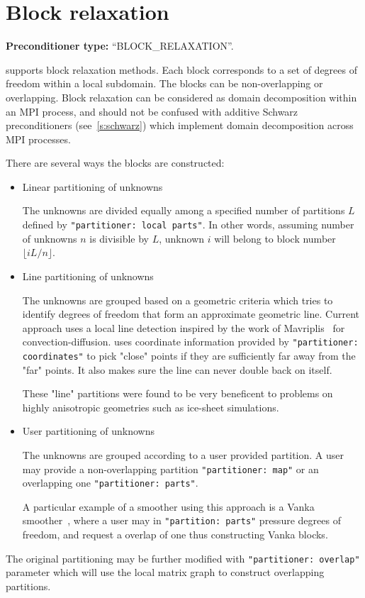\section{Block relaxation}\label{s:block_relaxation}

\textbf{Preconditioner type:} ``BLOCK\_RELAXATION''.


\ifpacktwo{} supports block relaxation methods. Each block corresponds to a set
of degrees of freedom within a local subdomain. The blocks can be
non-overlapping or overlapping. Block relaxation can be considered as domain
decomposition within an MPI process, and should not be confused with additive
Schwarz preconditioners (see~\ref{s:schwarz}) which implement domain
decomposition across MPI processes.

There are several ways the blocks are constructed:
\begin{itemize}
  \item Linear partitioning of unknowns

    The unknowns are divided equally among a specified number of
    partitions $L$ defined by {\tt "partitioner: local parts"}. In other words,
    assuming number of unknowns $n$ is divisible by $L$, unknown $i$ will belong
    to block number $\lfloor iL/n \rfloor$.

  \item Line partitioning of unknowns

    The unknowns are grouped based on a geometric criteria which tries to
    identify degrees of freedom that form an approximate geometric line.
    Current approach uses a local line detection inspired by the work of
    Mavriplis~\cite{Mavriplis1999} for convection-diffusion. \ifpacktwo uses
    coordinate information provided by {\tt "partitioner: coordinates"} to pick
    "close" points if they are sufficiently far away from the "far" points. It
    also makes sure the line can never double back on itself.

    These "line" partitions were found to be very beneficent to problems on
    highly anisotropic geometries such as ice-sheet simulations.

  \item User partitioning of unknowns

    The unknowns are grouped according to a user provided partition. A user
    may provide a non-overlapping partition {\tt "partitioner: map"} or an
    overlapping one {\tt "partitioner: parts"}.

    A particular example of a smoother using this approach is a Vanka
    smoother~\cite{Vanka1986}, where a user may in {\tt "partition: parts"} pressure
    degrees of freedom, and request a overlap of one thus constructing Vanka
    blocks.
\end{itemize}
The original partitioning may be further modified with {\tt "partitioner: overlap"}
parameter which will use the local matrix graph to construct overlapping
partitions.

